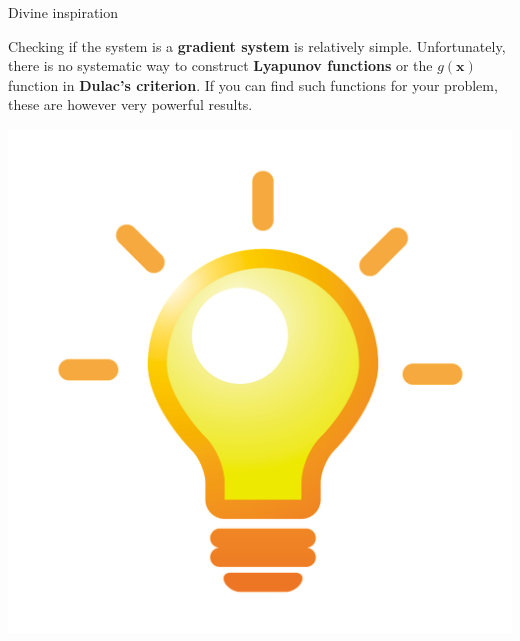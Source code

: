 \documentclass[usenames,dvipsnames,svgnames,10pt,aspectratio=169]{beamer}
\begin{document}
\begin{frame}[t, c]{Divine inspiration}{}
  \begin{minipage}{.68\textwidth}
    Checking if the system is a \alert{\textbf{gradient system}} is relatively simple.
    Unfortunately, there is no systematic way to construct \alert{\textbf{Lyapunov functions}} or the $g(\bm{x})$ function in \alert{\textbf{Dulac's criterion}}.
    If you can find such functions for your problem, these are however very powerful results.
  \end{minipage}%
  \hfill
  \begin{minipage}{.28\textwidth}
    \centering
    \includegraphics[width=.8\textwidth]{idea}
  \end{minipage}
\end{frame}
\end{document}
